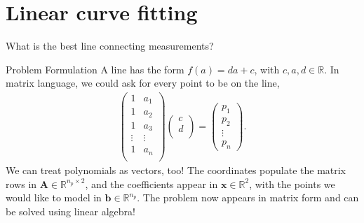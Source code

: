 \documentclass[notes]{beamer}
\begin{document}
  \section{Linear curve fitting}
    \begin{frame}{What is the best line connecting measurements?}
      \begin{figure}
      \centering
      
      \end{figure}
    \end{frame}

    \begin{frame}{Problem Formulation}
      A line has the form $f(a) = da + c$, with $c,a,d \in \mathbb{R}$. In matrix language, we could ask for every point to be on the line,
      \begin{align}
        \begin{pmatrix}
          1 & a_1 \\ 
          1 & a_2 \\
          1 & a_3 \\
          \vdots  & \vdots \\ 
          1 & a_n \\
        \end{pmatrix}
        \begin{pmatrix}
          c \\ d \\
        \end{pmatrix}
        = 
        \begin{pmatrix}
          p_1 \\
          p_2 \\
          \vdots \\ 
          p_n  
        \end{pmatrix}.
      \end{align}
      We can treat polynomials as vectors, too! The coordinates populate the matrix rows in $\mathbf{A} \in \mathbb{R}^{n_p \times 2}$, and the coefficients
      appear in $\mathbf{x} \in \mathbb{R}^{2}$, with the points we would like to model in $\mathbf{b} \in \mathbb{R}^{n_p}$.
      The problem now appears in matrix form and can be solved using linear algebra!
    \end{frame}
\end{document}
